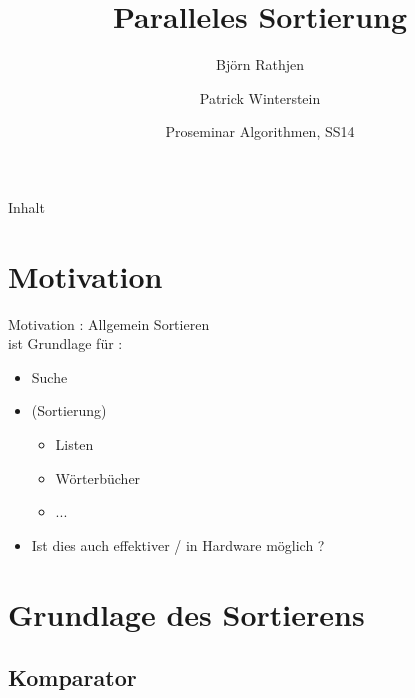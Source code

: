 \documentclass[ucs,9pt]{beamer}
\title[Para Sort] %
{Paralleles Sortierung}
\author[] %
{Björn Rathjen \and Patrick Winterstein}
\institute[FU Berlin] %
{Freie Universität Berlin}
\date[ProSem Algo]
{Proseminar Algorithmen, SS14}
\begin{document}
\begin{frame}[plain]
  \titlepage
\end{frame}
 
\begin{frame}{Inhalt}
\end{frame}


\section{Motivation}

\begin{frame}{Motivation : Allgemein}
Sortieren \\
    ist Grundlage für :
    \begin{itemize}
        \item Suche
        \item (Sortierung)
        \begin{itemize}
            \item Listen
            \item Wörterbücher
            \item ... 
        \end{itemize}
        \item Ist dies auch effektiver / in Hardware möglich ?
    \end{itemize}
\end{frame}

\section{Grundlage des Sortierens}
\subsection{Komparator}
\end{document}
